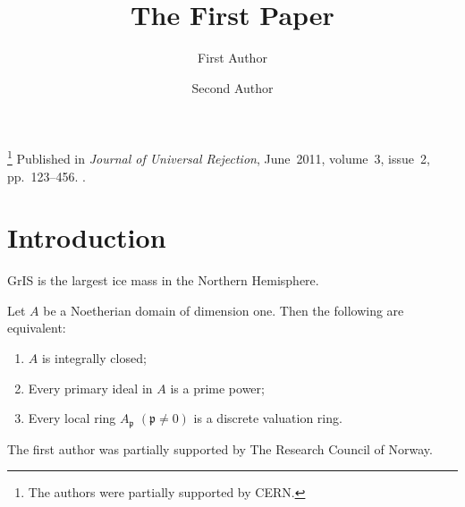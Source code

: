 \author
{
    First Author
    \and
    Second Author
}
\title{The First Paper}
\thanks{The authors were partially supported by CERN.}
\metadata
{
    Published in \emph{Journal of Universal Rejection},
    June~2011,
    volume~3,
    issue~2,
    pp.~123--456.
    .
}
\maketitle
\label{pap:first}

\begin{abstract}
    \kant[7]     %
\end{abstract}

\startcontents[chapters]

\section{Introduction}

\gls{GrIS} is the largest ice mass in the Northern Hemisphere.

\kant[8-11]      %

\begin{theorem}[{\citep{AM69}}]
    \label{thm:dedekind}
    Let \( A \) be a Noetherian domain of dimension one. Then the following are equivalent:
    \begin{enumerate}
        \item
        \( A \) is integrally closed;

        \item
        Every primary ideal in \( A \) is a prime power;

        \item
        Every local ring \( A_\mathfrak{p} \) \( (\mathfrak{p} \neq 0) \) is a discrete valuation ring.
    \end{enumerate}
\end{theorem}

\begin{acknowledgements}
    The first author was partially supported by The Research Council of Norway.
\end{acknowledgements}

\printbibliography[heading = subbibliography]
\stopcontents[chapters]

